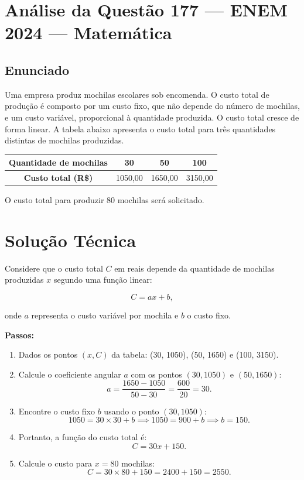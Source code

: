 \documentclass{article}
\begin{document}
\section*{Análise da Questão 177 — ENEM 2024 — Matemática}

\subsection*{Enunciado}
Uma empresa produz mochilas escolares sob encomenda. O custo total de produção é composto por um custo fixo, que não depende do número de mochilas, e um custo variável, proporcional à quantidade produzida. O custo total cresce de forma linear. A tabela abaixo apresenta o custo total para três quantidades distintas de mochilas produzidas.

\begin{center}
\begin{tabular}{|c|c|c|c|}
  \hline
  \rowcolor{pink}
  \textbf{Quantidade de mochilas} & 30 & 50 & 100 \\
  \hline
  \textbf{Custo total (R\$)} & 1050,00 & 1650,00 & 3150,00 \\
  \hline
\end{tabular}
\end{center}

O custo total para produzir 80 mochilas será solicitado.

\section*{Solução Técnica}

Considere que o custo total $C$ em reais depende da quantidade de mochilas produzidas $x$ segundo uma função linear:

\[
C = ax + b,
\]

onde $a$ representa o custo variável por mochila e $b$ o custo fixo.

\textbf{Passos:}
\begin{enumerate}
  \item Dados os pontos $(x, C)$ da tabela: (30, 1050), (50, 1650) e (100, 3150).
  \item Calcule o coeficiente angular $a$ com os pontos $(30,1050)$ e $(50,1650)$:
  \[
  a = \frac{1650 - 1050}{50 - 30} = \frac{600}{20} = 30.
  \]
  \item Encontre o custo fixo $b$ usando o ponto $(30, 1050)$:
  \[
  1050 = 30 \times 30 + b \implies 1050 = 900 + b \implies b = 150.
  \]
  \item Portanto, a função do custo total é:
  \[
  C = 30x + 150.
  \]
  \item Calcule o custo para $x=80$ mochilas:
  \[
  C = 30 \times 80 + 150 = 2400 + 150 = 2550.
  \]
\end{enumerate}
\end{document}
